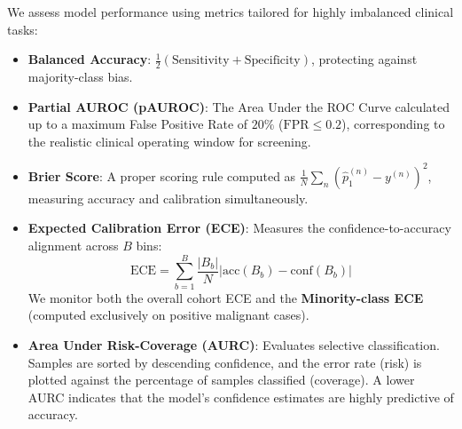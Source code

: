 \documentclass[11pt]{article}
\begin{document}
We assess model performance using metrics tailored for highly imbalanced clinical tasks:
\begin{itemize}
    \item \textbf{Balanced Accuracy}: $\frac{1}{2}(\text{Sensitivity} + \text{Specificity})$, protecting against majority-class bias.
    \item \textbf{Partial AUROC (pAUROC)}: The Area Under the ROC Curve calculated up to a maximum False Positive Rate of $20\%$ ($\text{FPR} \le 0.2$), corresponding to the realistic clinical operating window for screening.
    \item \textbf{Brier Score}: A proper scoring rule computed as $\frac{1}{N}\sum_n (\hat{p}_{1}^{(n)} - y^{(n)})^2$, measuring accuracy and calibration simultaneously.
    \item \textbf{Expected Calibration Error (ECE)}: Measures the confidence-to-accuracy alignment across $B$ bins:
    \begin{equation}\label{eq:ece}
        \text{ECE} = \sum_{b=1}^B \frac{|B_b|}{N} \left|\text{acc}(B_b) - \text{conf}(B_b)\right|
    \end{equation}
    We monitor both the overall cohort ECE and the \textbf{Minority-class ECE} (computed exclusively on positive malignant cases).
    \item \textbf{Area Under Risk-Coverage (AURC)}: Evaluates selective classification. Samples are sorted by descending confidence, and the error rate (risk) is plotted against the percentage of samples classified (coverage). A lower AURC indicates that the model's confidence estimates are highly predictive of accuracy.
\end{itemize}
\end{document}
